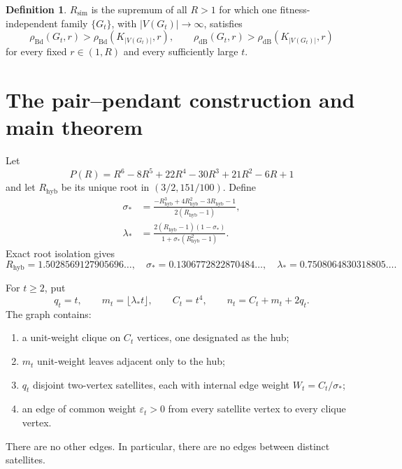 \documentclass[11pt]{article}
\theoremstyle{definition}
\newtheorem{definition}[theorem]{Definition}
\theoremstyle{remark}
\newcommand{\Bd}{\mathrm{Bd}}
\newcommand{\dB}{\mathrm{dB}}
\newcommand{\Rsim}{R_{\mathrm{sim}}}
\newcommand{\Rhyb}{R_{\mathrm{hyb}}}
\newcommand{\eps}{\varepsilon}
\begin{document}
\begin{definition}
$\Rsim$ is the supremum of all $R>1$ for which one
fitness-independent family $\{G_t\}$, with $|V(G_t)|\to\infty$, satisfies
\[
 \rho_{\Bd}(G_t,r)>\rho_{\Bd}(K_{|V(G_t)|},r),\qquad
 \rho_{\dB}(G_t,r)>\rho_{\dB}(K_{|V(G_t)|},r)
\]
for every fixed $r\in(1,R)$ and every sufficiently large $t$.
\end{definition}

\section{The pair--pendant construction and main theorem}

Let
\[
 P(R)=R^6-8R^5+22R^4-30R^3+21R^2-6R+1
\]
and let $\Rhyb$ be its unique root in $(3/2,151/100)$.  Define
\begin{align}
 \sigma_*&=
 \frac{-\Rhyb^3+4\Rhyb^2-3\Rhyb-1}{2(\Rhyb-1)},\\
 \lambda_*&=
 \frac{2(\Rhyb-1)(1-\sigma_*)}
 {1+\sigma_*(\Rhyb^2-1)}.
\end{align}
Exact root isolation gives
\[
 \Rhyb=1.5028569127905696\ldots,\quad
 \sigma_*=0.1306772822870484\ldots,\quad
 \lambda_*=0.7508064830318805\ldots .
\]

For $t\geq2$, put
\[
 q_t=t,\qquad m_t=\lfloor\lambda_*t\rfloor,\qquad C_t=t^4,
\qquad n_t=C_t+m_t+2q_t.
\]
The graph contains:
\begin{enumerate}
\item a unit-weight clique on $C_t$ vertices, one designated as the hub;
\item $m_t$ unit-weight leaves adjacent only to the hub;
\item $q_t$ disjoint two-vertex satellites, each with internal edge weight
      $W_t=C_t/\sigma_*$;
\item an edge of common weight $\eps_t>0$ from every satellite vertex to
      every clique vertex.
\end{enumerate}
There are no other edges.  In particular, there are no edges between
distinct satellites.
\end{document}
